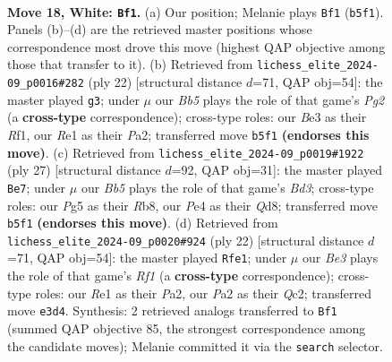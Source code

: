 \documentclass[11pt]{article}
\begin{document}
\clearpage

\begin{figure}[p]\centering
\begin{subfigure}{0.46\textwidth}\centering
\resizebox{\linewidth}{!}{%
\newchessgame
\chessboard[
  setfen={rn2b2r/ppq1k1bp/3pp1p1/1B2p1Pn/4P3/2N1B3/PPPK1PQP/3RR3 w - - 4 18},
  showmover=false,
  pgfstyle=straightmove, color=movearrow, markmove={b5-f1}
]}
\caption{}
\end{subfigure}\hfill
\begin{subfigure}{0.46\textwidth}\centering
\resizebox{\linewidth}{!}{%
\newchessgame
\chessboard[
  setfen={rnbqr1k1/pp3pp1/2pb1p2/8/3P1B2/2PB3p/PPQ1NPPP/R4RK1 w - - 0 12},
  showmover=false,
  pgfstyle=straightmove, color=movearrow, markmove={g2-g3}
]}
\caption{}
\end{subfigure}
\\[4pt]
\begin{subfigure}{0.46\textwidth}\centering
\resizebox{\linewidth}{!}{%
\newchessgame
\chessboard[
  setfen={1r1q1rk1/1bpn1pp1/pp1bp2p/8/2PPN3/4B1P1/PPQ2PBP/R2R2K1 b - - 2 14},
  showmover=false,
  pgfstyle=straightmove, color=movearrow, markmove={d6-e7}
]}
\caption{}
\end{subfigure}\hfill
\begin{subfigure}{0.46\textwidth}\centering
\resizebox{\linewidth}{!}{%
\newchessgame
\chessboard[
  setfen={rnbqr1k1/pp3pp1/2pb1p2/8/3P1B2/2PB3p/PPQ1NPPP/R4RK1 w - - 0 12},
  showmover=false,
  pgfstyle=straightmove, color=movearrow, markmove={f1-e1}
]}
\caption{}
\end{subfigure}
\caption{\textbf{Move 18, White: \texttt{Bf1}.} (a) Our position; Melanie plays \texttt{Bf1} (\texttt{b5f1}). Panels (b)--(d) are the retrieved master positions whose correspondence most drove this move (highest QAP objective among those that transfer to it). (b) Retrieved from \texttt{lichess\_elite\_2024-09\_p0016\#282} (ply 22) [structural distance $d$=71, QAP obj=54]: the master played \texttt{g3}; under $\mu$ our \emph{Bb5} plays the role of that game's \emph{Pg2} (a \textbf{cross-type} correspondence); cross-type roles: our \emph{B}e3 as their \emph{R}f1, our \emph{R}e1 as their \emph{P}a2; transferred move \texttt{b5f1} \textbf{(endorses this move)}. (c) Retrieved from \texttt{lichess\_elite\_2024-09\_p0019\#1922} (ply 27) [structural distance $d$=92, QAP obj=31]: the master played \texttt{Be7}; under $\mu$ our \emph{Bb5} plays the role of that game's \emph{Bd3}; cross-type roles: our \emph{P}g5 as their \emph{R}b8, our \emph{P}e4 as their \emph{Q}d8; transferred move \texttt{b5f1} \textbf{(endorses this move)}. (d) Retrieved from \texttt{lichess\_elite\_2024-09\_p0020\#924} (ply 22) [structural distance $d$=71, QAP obj=54]: the master played \texttt{Rfe1}; under $\mu$ our \emph{Be3} plays the role of that game's \emph{Rf1} (a \textbf{cross-type} correspondence); cross-type roles: our \emph{R}e1 as their \emph{P}a2, our \emph{P}a2 as their \emph{Q}c2; transferred move \texttt{e3d4}. Synthesis: 2 retrieved analogs transferred to \texttt{Bf1} (summed QAP objective 85, the strongest correspondence among the candidate moves); Melanie committed it via the \texttt{search} selector.}
\label{fig:thought-m34}
\end{figure}
\end{document}
